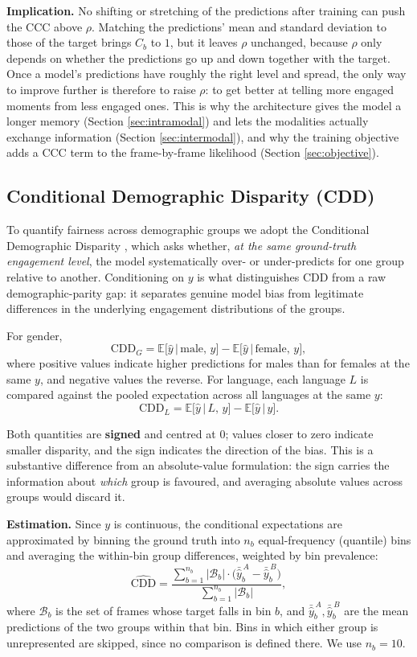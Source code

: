 \documentclass[10pt,a4paper,twocolumn]{article}
\begin{document}
	\textbf{Implication.} No shifting or stretching of the predictions after training can push the CCC above $\rho$. Matching the predictions' mean and standard deviation to those of the target brings $C_b$ to $1$, but it leaves $\rho$ unchanged, because $\rho$ only depends on whether the predictions go up and down together with the target. Once a model's predictions have roughly the right level and spread, the only way to improve further is therefore to raise $\rho$: to get better at telling more engaged moments from less engaged ones. This is why the architecture gives the model a longer memory (Section \ref{sec:intramodal}) and lets the modalities actually exchange information (Section \ref{sec:intermodal}), and why the training objective adds a CCC term to the frame-by-frame likelihood (Section \ref{sec:objective}).
	
	\subsection*{Conditional Demographic Disparity (CDD)}
	\label{sec:cdd}
	To quantify fairness across demographic groups we adopt the Conditional Demographic Disparity \cite{wachter2021, withanage25}, which asks whether, \emph{at the same ground-truth engagement level}, the model systematically over- or under-predicts for one group relative to another. Conditioning on $y$ is what distinguishes CDD from a raw demographic-parity gap: it separates genuine model bias from legitimate differences in the underlying engagement distributions of the groups.
	
	For gender,
	$$
	\text{CDD}_G = \mathbb{E}\bigl[\hat{y} \,\big|\, \text{male},\, y\bigr] - \mathbb{E}\bigl[\hat{y} \,\big|\, \text{female},\, y\bigr],
	$$
	where positive values indicate higher predictions for males than for females at the same $y$, and negative values the reverse. For language, each language $L$ is compared against the pooled expectation across all languages at the same $y$:
	$$
	\text{CDD}_L = \mathbb{E}\bigl[\hat{y} \,\big|\, L,\, y\bigr] - \mathbb{E}\bigl[\hat{y} \,\big|\, y\bigr].
	$$
	
	Both quantities are \textbf{signed} and centred at $0$; values closer to zero indicate smaller disparity, and the sign indicates the direction of the bias. This is a substantive difference from an absolute-value formulation: the sign carries the information about \emph{which} group is favoured, and averaging absolute values across groups would discard it.
	
	\textbf{Estimation.} Since $y$ is continuous, the conditional expectations are approximated by binning the ground truth into $n_b$ equal-frequency (quantile) bins and averaging the within-bin group differences, weighted by bin prevalence:
	$$
	\widehat{\text{CDD}} = \frac{\sum_{b=1}^{n_b} |\mathcal{B}_b| \cdot \bigl(\bar{\hat{y}}^{\,A}_b - \bar{\hat{y}}^{\,B}_b\bigr)}{\sum_{b=1}^{n_b} |\mathcal{B}_b|},
	$$
	where $\mathcal{B}_b$ is the set of frames whose target falls in bin $b$, and $\bar{\hat{y}}^{\,A}_b, \bar{\hat{y}}^{\,B}_b$ are the mean predictions of the two groups within that bin. Bins in which either group is unrepresented are skipped, since no comparison is defined there. We use $n_b = 10$.
	
\end{document}
